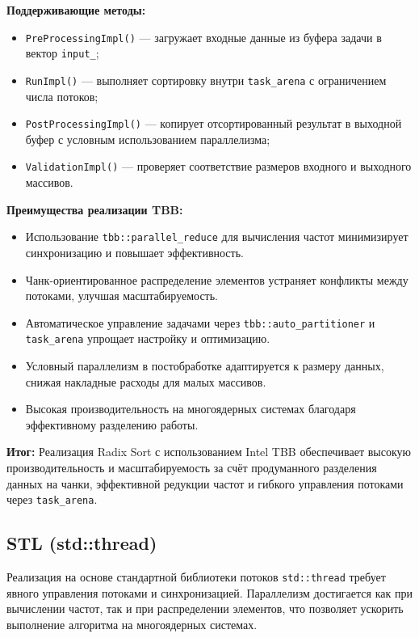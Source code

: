 \documentclass[12pt]{article}
\begin{document}
\textbf{Поддерживающие методы:}
\begin{itemize}
  \item \texttt{PreProcessingImpl()} — загружает входные данные из буфера задачи в вектор \texttt{input\_};
  \item \texttt{RunImpl()} — выполняет сортировку внутри \texttt{task\_arena} с ограничением числа потоков;
  \item \texttt{PostProcessingImpl()} — копирует отсортированный результат в выходной буфер с условным использованием параллелизма;
  \item \texttt{ValidationImpl()} — проверяет соответствие размеров входного и выходного массивов.
\end{itemize}

\textbf{Преимущества реализации TBB:}
\begin{itemize}
  \item Использование \texttt{tbb::parallel\_reduce} для вычисления частот минимизирует синхронизацию и повышает эффективность.
  \item Чанк-ориентированное распределение элементов устраняет конфликты между потоками, улучшая масштабируемость.
  \item Автоматическое управление задачами через \texttt{tbb::auto\_partitioner} и \texttt{task\_arena} упрощает настройку и оптимизацию.
  \item Условный параллелизм в постобработке адаптируется к размеру данных, снижая накладные расходы для малых массивов.
  \item Высокая производительность на многоядерных системах благодаря эффективному разделению работы.
\end{itemize}

\textbf{Итог:} Реализация Radix Sort с использованием Intel TBB обеспечивает высокую производительность и масштабируемость за счёт продуманного разделения данных на чанки, эффективной редукции частот и гибкого управления потоками через \texttt{task\_arena}.

\subsection{STL (std::thread)}

Реализация на основе стандартной библиотеки потоков \texttt{std::thread} требует явного управления потоками и синхронизацией. Параллелизм достигается как при вычислении частот, так и при распределении элементов, что позволяет ускорить выполнение алгоритма на многоядерных системах.
\end{document}
